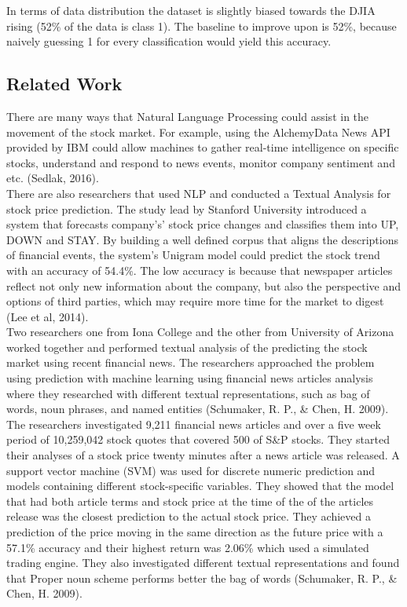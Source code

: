 \documentclass[11pt,a4paper]{article}
\begin{document}
In terms of data distribution the dataset is slightly biased towards the DJIA rising (52\% of the data is class 1). The baseline to improve upon is 52\%, because naively guessing 1 for every classification would yield this accuracy.\\


\subsection{Related Work}
There are many ways that Natural Language Processing could assist in the movement of the  stock market. For example, using the AlchemyData News API provided by IBM could allow machines to gather real-time intelligence on specific stocks, understand and respond to news events, monitor company sentiment and etc. (Sedlak, 2016).\\

There are also researchers that used NLP and conducted a Textual Analysis for stock price prediction. The study lead by Stanford University introduced a system that forecasts company's’ stock price changes and classifies them into UP, DOWN and STAY. By building a well defined corpus that aligns the descriptions of financial events, the system’s Unigram model could predict the stock trend with an accuracy of 54.4\%. The low accuracy is because that  newspaper articles reflect not only new information about the company, but also the perspective and options of third parties, which may require more time for the market to digest (Lee et al, 2014).\\

Two researchers one from Iona College and the other from University of Arizona worked together and performed textual analysis of the predicting the stock market using recent financial news. The researchers approached the problem using prediction with machine learning using financial news articles analysis where they researched with different textual representations, such as bag of words, noun phrases, and named entities (Schumaker, R. P., & Chen, H. 2009).\\

The researchers investigated 9,211 financial news articles and over a five week period of 10,259,042 stock quotes that covered 500 of S&P stocks. They started their analyses of a stock price twenty minutes after a news article was released. A support vector machine (SVM) was used for discrete numeric prediction and models containing different stock-specific variables. They showed that the model that had both article terms and stock price at the time of the of the articles release was the closest prediction to the actual stock price. They achieved a prediction of the price moving in the same direction as the future price with a 57.1\% accuracy and their highest return was 2.06\% which used a simulated trading engine. They also investigated different textual representations and found that Proper noun scheme performs better the bag of words (Schumaker, R. P., & Chen, H. 2009).\\
\end{document}
